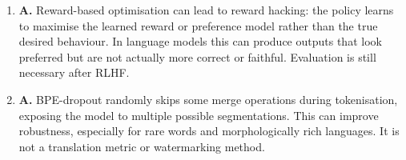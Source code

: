 \documentclass[11pt,a4paper]{article}
\begin{document}
\begin{enumerate}[leftmargin=*]
\begin{enumerate}
\item \textbf{A.} Reward-based optimisation can lead to reward hacking: the policy learns to maximise the learned reward or preference model rather than the true desired behaviour. In language models this can produce outputs that look preferred but are not actually more correct or faithful. Evaluation is still necessary after RLHF.
\item \textbf{A.} BPE-dropout randomly skips some merge operations during tokenisation, exposing the model to multiple possible segmentations. This can improve robustness, especially for rare words and morphologically rich languages. It is not a translation metric or watermarking method.
\end{enumerate}
\end{enumerate}
\end{document}
